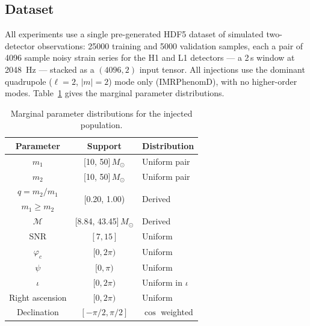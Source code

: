 \subsection{Dataset}
\label{sec:phicpsi:dataset}

All experiments use a single pre-generated HDF5 dataset of simulated two-detector observations: \num{25000} training and \num{5000} validation samples, each a pair of \num{4096} sample noisy strain series for the H1 and L1 detectors --- a 2\,s window at \SI{2048}{\hertz} --- stacked as a $(4096,2)$ input tensor.
All injections use the dominant quadrupole ($\ell=2$, $|m|=2$) mode only (IMRPhenomD), with no higher-order modes.
Table~\ref{tab:population} gives the marginal parameter distributions.

\newcommand{\mrows}[2]{\multirow{#1}{*}{#2}}

\begin{table}[!hb]
    \centering
    \caption{Marginal parameter distributions for the injected population.}
    \label{tab:population}
    \small
    \begin{tabular}{@{}ccl@{}}
        \toprule
        Parameter & Support & Distribution \\
        \midrule
        $m_1$ & [10, 50]$\,M_\odot$ & Uniform pair\\
        $m_2$ & [10, 50]$\,M_\odot$ & Uniform pair\\
        $q=m_2/m_1$ & \mrows{2}{[0.20, 1.00)} & \mrows{2}{Derived} \\
        $m_1\geq m_2$ & & \\
        $\mathcal{M}$ & [8.84, 43.45]$\,M_\odot$ & Derived \\
        SNR & $[7,15]$ & Uniform \\
        $\varphi_c$ & $[0,2\pi)$ & Uniform \\
        $\psi$ & $[0,\pi)$ & Uniform \\
        $\iota$ & $[0,2\pi)$ & Uniform in $\iota$ \\
        Right ascension & $[0,2\pi)$ & Uniform \\
        Declination & $[-\pi/2,\pi/2]$ & $\cos$ weighted \\
        \bottomrule
    \end{tabular}
\end{table}

